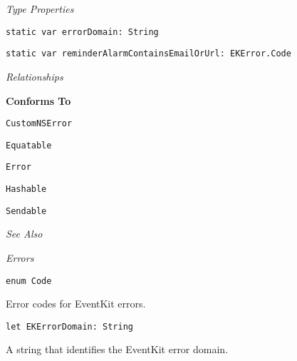 \documentclass{article}
\begin{document}
\textit{Type Properties}

\texttt{static var errorDomain: String}

\texttt{static var reminderAlarmContainsEmailOrUrl: EKError.Code}

\textit{Relationships}

\textbf{Conforms To}

\texttt{CustomNSError}

\texttt{Equatable}

\texttt{Error}

\texttt{Hashable}

\texttt{Sendable}

\textit{See Also}

\textit{Errors}

\texttt{enum Code}

Error codes for EventKit errors.

\texttt{let EKErrorDomain: String}

A string that identifies the EventKit error domain.
\newpage
\end{document}
